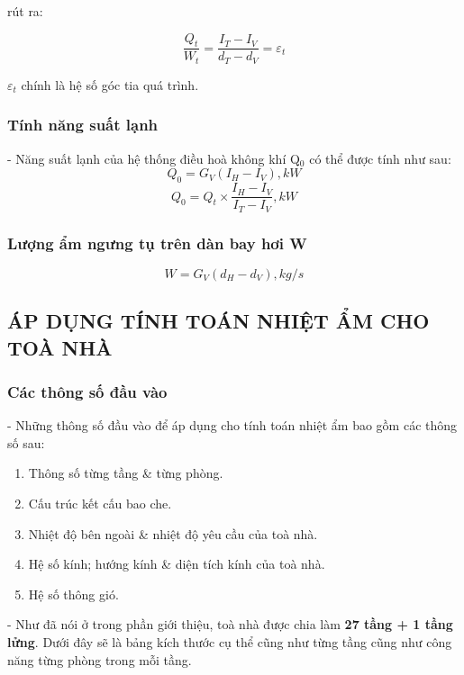 rút ra:

\begin{equation}
	 \dfrac{Q_{t}}{W_{t}}  =  \dfrac{I_{T} - I_{V}}{d_{T} - d_{V}}  = \varepsilon_{t}
\end{equation}

{\Large $\varepsilon_{t}$} chính là hệ số góc tia quá trình.

\subsubsection{Tính năng suất lạnh}
- Năng suất lạnh của hệ thống điều hoà không khí Q$ _{0} $ có thể được tính như sau:
\begin{equation}
	Q _{0} = G_{V}(I_{H} - I_{V}), \textit{kW}
\end{equation}
\begin{equation}
	 Q _{0} = Q_{t}\times\dfrac{I_{H} - I_{V}}{I_{T} - I_{V}}, \textit{kW}
\end{equation}


\subsubsection{Lượng ẩm ngưng tụ trên dàn bay hơi W} 
\begin{equation}
	 W = G_{V}(d_{H}-d_{V}), \textit{kg/s}
\end{equation}

\subsection{ÁP DỤNG TÍNH TOÁN NHIỆT ẨM CHO TOÀ NHÀ}
\subsubsection{Các thông số đầu vào}
- Những thông số đầu vào để áp dụng cho tính toán nhiệt ẩm bao gồm các thông số sau:

\begin{enumerate}[leftmargin=2.2cm]
	\item Thông số từng tầng \& từng phòng.
	\item Cấu trúc kết cấu bao che.
	\item Nhiệt độ bên ngoài \& nhiệt độ yêu cầu của toà nhà.
	\item Hệ số kính; hướng kính \& diện tích kính của toà nhà.
	\item Hệ số thông gió.
\end{enumerate}

- Như đã nói ở trong phần giới thiệu, toà nhà được chia làm \textbf{27 tầng + 1 tầng lửng}. Dưới đây sẽ là bảng kích thước cụ thể cũng như từng tầng cũng như công năng từng phòng trong mỗi tầng.


